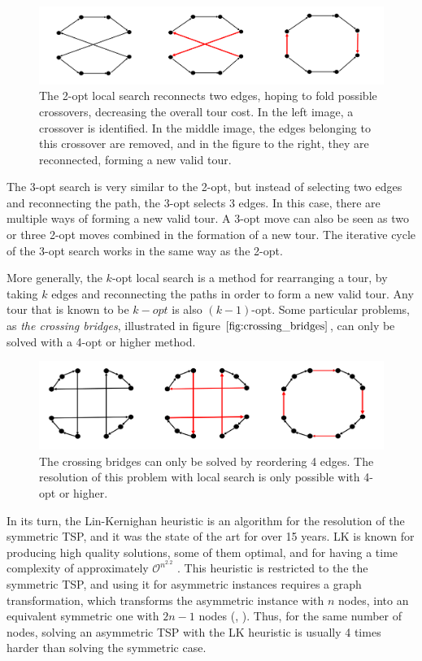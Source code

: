 \begin{figure}[htpb]
  \centering
  \includegraphics[width=.7\textwidth]{./Figures/tsp/2-opt-explained}
  \caption{The 2-opt local search reconnects two edges, hoping to
  fold possible crossovers, decreasing the overall tour cost. In the left image,
  a crossover is identified. In the middle image, the edges belonging to this crossover
  are removed, and in the figure to the right, they are reconnected, forming a new valid tour.}
  \label{fig:two_opt_move}
\end{figure}

The 3-opt search is very similar to the 2-opt, but instead of selecting two edges and reconnecting the path, the 3-opt selects 3 edges. In this case, there are multiple ways of forming a new valid tour. A 3-opt move can also be seen as two or three 2-opt moves combined in the formation of a new tour. The iterative cycle of the 3-opt search works in the same way as the 2-opt.

More generally, the $k$-opt local search is a method for rearranging a tour, by taking $k$ edges and reconnecting the paths in order to form a new valid tour. Any tour that is known to be $k-opt$ is also $(k-1)$-opt. Some particular problems, as \textit{the crossing bridges}, illustrated in figure $\ref{fig:crossing_bridges}$, can only be solved with a 4-opt or higher method.

\begin{figure}[htbp]
  \centering
  \includegraphics[width=.7\textwidth]{./Figures/tsp/crossing_bridges}
  \caption{The crossing bridges can only be solved by reordering 4 edges.
  The resolution of this problem with local search is only possible
  with 4-opt or higher.}
  \label{fig:crossing_bridges}
\end{figure}


In its turn, the Lin-Kernighan heuristic \cite{lkh_original} is an algorithm for the resolution of  the symmetric TSP, and it was the state of the art for over 15 years. LK is known for producing high quality solutions, some of them optimal, and for having a time complexity of approximately $\mathcal{O}^{n^{2.2}}$ \cite{heuristics_tsp}. This heuristic is restricted to the  the symmetric TSP, and using it for asymmetric instances requires a graph transformation, which transforms the asymmetric instance with $n$ nodes, into an equivalent symmetric one with $2n-1$ nodes (\cite{atsp_to_tsp_1}, \cite{atsp_to_tsp_2}). Thus, for the same number of nodes, solving an asymmetric TSP with the LK heuristic is usually 4 times harder than solving the symmetric case.

